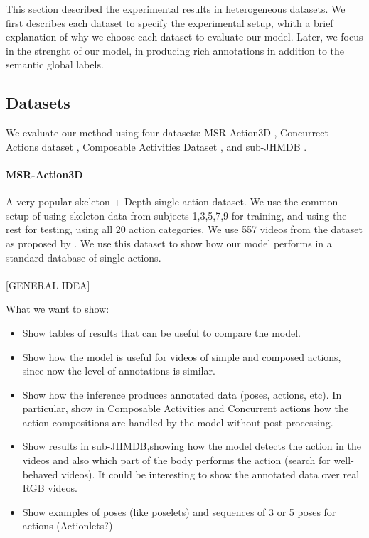 This section described the experimental results in heterogeneous datasets. We first describes each dataset to specify the experimental setup, whith a brief explanation of why we choose each dataset to evaluate our model. Later, we focus in the strenght of our model, in producing rich annotations in addition to the semantic global labels. 

\subsection{Datasets}
We evaluate our method using four datasets: MSR-Action3D \cite{WanLi2010}, Concurrect Actions dataset \cite{Wei2013}, Composable Activities Dataset \cite{Lillo2014}, and sub-JHMDB \cite{Jhuang2013}.

\paragraph{MSR-Action3D} A very popular skeleton + Depth single action dataset. We use the common setup of using skeleton data from subjects 1,3,5,7,9 for training, and using the rest for testing, using all 20 action categories. We use 557 videos from the dataset as proposed by \cite{Wang2012}. We use this dataset to show how our model performs in a standard database of single actions.

\paragraph{}

[GENERAL IDEA]

What we want to show:
\begin{itemize}
\item Show tables of results that can be useful to compare the model.
\item Show how the model is useful for videos of simple and composed actions, since now the level of annotations is similar.
\item Show how the inference produces annotated data (poses, actions, etc). In particular, show in Composable Activities and Concurrent actions how the action compositions are handled by the model without post-processing.
\item Show results in sub-JHMDB,showing how the model detects the action in the videos and also which part of the body performs the action (search for well-behaved videos). It could be interesting to show the annotated data over real RGB videos. 
\item Show examples of poses (like poselets) and sequences of 3 or 5 poses for actions (Actionlets?)
\end{itemize}

